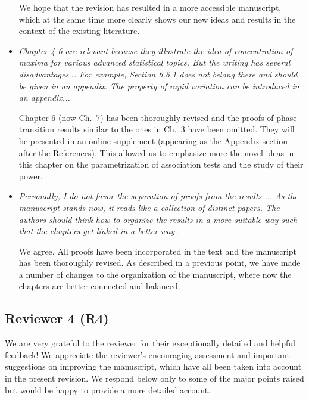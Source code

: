 \documentclass[11pt]{article}
\begin{document}
\begin{itemize}
     We hope that the revision has resulted in a more accessible manuscript, which at the same time more clearly shows our new ideas and results in the
     context of the existing literature.
     
     \item {\em Chapter 4-6 are relevant because they illustrate the idea of concentration of maxima for various advanced statistical topics. But the writing has several disadvantages... For example, Section 6.6.1 does not belong there and should be given in an appendix. The property of rapid variation can be introduced in an appendix...}
     
     Chapter 6 (now Ch.\ 7) has been thoroughly revised and the proofs of phase-transition results similar to the ones in Ch.\ 3 have been omitted.  They
     will be presented in an online supplement (appearing as the Appendix section after the References).  This 
     allowed us to emphasize more the novel ideas in this chapter on the parametrization of association tests and the study of their power.  
     
         
     \item {\em Personally, I do not favor the separation of proofs from the results ... As the manuscript stands now, it reads like a collection of distinct papers. 
     The authors should think how to organize the results in a more suitable way such that the chapters get linked in a better way.}
     
     We agree.  All proofs have been incorporated in the text and the manuscript has been thoroughly revised.  As described in a previous point, we have
     made a number of changes to the organization of the manuscript, where now the chapters are better connected and balanced.
     
     
   \end{itemize}
   
   \subsection{Reviewer 4 (R4)}
   
   We are very grateful to the reviewer for their exceptionally detailed and helpful feedback!  We appreciate the reviewer's encouraging assessment and 
   important suggestions on improving the manuscript, which have all been taken into account in the present revision.  We respond below only to some
   of the major points raised but would be happy to provide a more detailed account.
  
\end{document}
